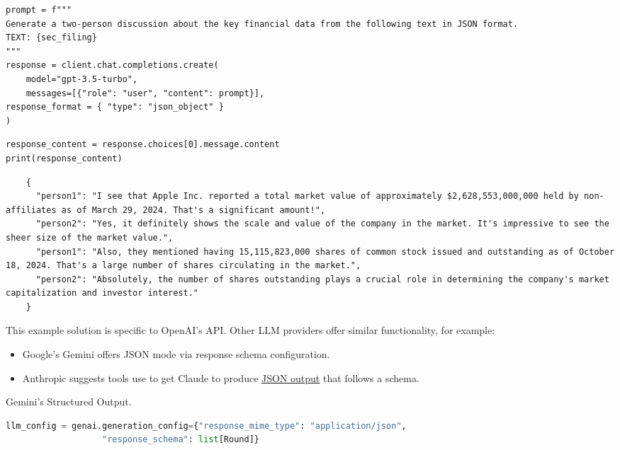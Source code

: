 \begin{verbatim}
prompt = f"""
Generate a two-person discussion about the key financial data from the following text in JSON format.
TEXT: {sec_filing}
"""
response = client.chat.completions.create(
    model="gpt-3.5-turbo",
    messages=[{"role": "user", "content": prompt}],
response_format = { "type": "json_object" }
)
\end{verbatim}

\begin{verbatim}
response_content = response.choices[0].message.content
print(response_content)
\end{verbatim}
    \begin{verbatim}
    {
      "person1": "I see that Apple Inc. reported a total market value of approximately $2,628,553,000,000 held by non-affiliates as of March 29, 2024. That's a significant amount!",
      "person2": "Yes, it definitely shows the scale and value of the company in the market. It's impressive to see the sheer size of the market value.",
      "person1": "Also, they mentioned having 15,115,823,000 shares of common stock issued and outstanding as of October 18, 2024. That's a large number of shares circulating in the market.",
      "person2": "Absolutely, the number of shares outstanding plays a crucial role in determining the company's market capitalization and investor interest."
    }
    \end{verbatim}

This example solution is specific to OpenAI's API. Other LLM providers offer similar functionality, for example:

\begin{itemize}
    \item Google's Gemini offers JSON mode via response schema configuration.
    \item Anthropic  suggests tools use to get Claude to produce \href{https://docs.anthropic.com/en/docs/build-with-claude/tool-use#json-mode}{JSON output} that follows a schema.
\end{itemize}
\begin{marginlisting}[-1.35cm]
	\caption{Gemini's Structured Output.}
    \label{lst:gemini-structured}
	\vspace{0.6cm}
	\begin{lstlisting}[language=Python,style=kaolstplain]
llm_config = genai.generation_config={"response_mime_type": "application/json",
                   "response_schema": list[Round]}
	\end{lstlisting}
\end{marginlisting}



